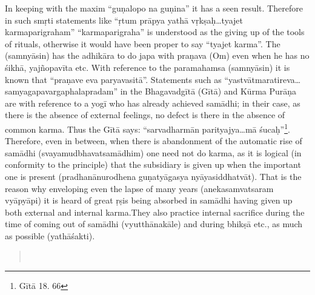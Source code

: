 In keeping with the maxim “guṇalopo na guṇina” it has a seen result. Therefore in such smṛti statements like “ṛtum prāpya yathā vṛkṣaḥ…tyajet karmaparigraham” “karmaparigraha” is understood as the giving up of the tools of rituals, otherwise it would have been proper to say “tyajet karma”. The (samnyāsin) has the adhikāra to do japa with praṇava (Om) even when he has no śikhā, yajñopavīta etc.  With reference to the paramahamsa (samnyāsin) it is known that “praṇave eva paryavasitā”. Statements such as “yastvātmaratireva… samyagapavargaphalapradam” in the Bhagavadgītā (Gītā) and Kūrma Purāṇa are with reference to a yogī who has already achieved samādhi; in their case, as there is the absence of external feelings, no defect is there in the absence of common karma. Thus the Gītā says: “sarvadharmān parityajya…mā śucaḥ”\footnote{Gītā 18. 66}. Therefore, even in between, when there is abandonment of the automatic rise of samādhi (svayamudbhavatsamādhim) one need not do karma, as it is logical (in conformity to the principle) that the subsidiary is given up when the important one is present (pradhanānurodhena guṇatyāgasya nyāyasiddhatvāt). That is the reason why enveloping even the lapse of many years (anekasamvatsaram vyāpyāpi) it is heard of great ṛṣis being absorbed in samādhi having given up both external and internal karma.They also practice internal sacrifice during the time of coming out of samādhi (vyutthānakāle) and during bhikṣā etc., as much as possible (yathāśakti).

\begin{verse}
\\
\end{verse}

